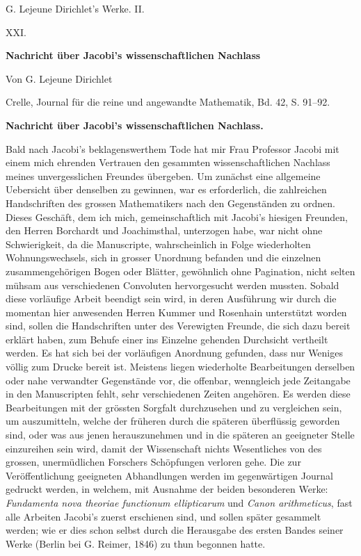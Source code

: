 \documentclass[11pt]{article}
\begin{document}
\begin{center}
{\Large G. Lejeune Dirichlet's Werke. II.}\par\vspace{1.2em}
{\Large XXI.}\par\vspace{0.5em}
{\LARGE \textbf{Nachricht über Jacobi's wissenschaftlichen Nachlass}}\par\vspace{1em}
{\large Von G. Lejeune Dirichlet}\par\vspace{0.5em}
{\small Crelle, Journal für die reine und angewandte Mathematik, Bd. 42, S. 91--92.}
\end{center}

\bigskip
\begin{center}
{\large \textbf{Nachricht über Jacobi's wissenschaftlichen Nachlass.}}
\end{center}

Bald nach Jacobi's beklagenswerthem Tode hat mir Frau Professor Jacobi mit einem mich ehrenden Vertrauen den gesammten wissenschaftlichen Nachlass meines unvergesslichen Freundes übergeben. Um zunächst eine allgemeine Uebersicht über denselben zu gewinnen, war es erforderlich, die zahlreichen Handschriften des grossen Mathematikers nach den Gegenständen zu ordnen. Dieses Geschäft, dem ich mich, gemeinschaftlich mit Jacobi's hiesigen Freunden, den Herren Borchardt und Joachimsthal, unterzogen habe, war nicht ohne Schwierigkeit, da die Manuscripte, wahrscheinlich in Folge wiederholten Wohnungswechsels, sich in grosser Unordnung befanden und die einzelnen zusammengehörigen Bogen oder Blätter, gewöhnlich ohne Pagination, nicht selten mühsam aus verschiedenen Convoluten hervorgesucht werden mussten. Sobald diese vorläufige Arbeit beendigt sein wird, in deren Ausführung wir durch die momentan hier anwesenden Herren Kummer und Rosenhain unterstützt worden sind, sollen die Handschriften unter des Verewigten Freunde, die sich dazu bereit erklärt haben, zum Behufe einer ins Einzelne gehenden Durchsicht vertheilt werden. Es hat sich bei der vorläufigen Anordnung gefunden, dass nur Weniges völlig zum Drucke bereit ist. Meistens liegen wiederholte Bearbeitungen derselben oder nahe verwandter Gegenstände vor, die offenbar, wenngleich jede Zeitangabe in den Manuscripten fehlt, sehr verschiedenen Zeiten angehören. Es werden diese Bearbeitungen mit der grössten Sorgfalt durchzusehen und zu vergleichen sein, um auszumitteln, welche der früheren durch die späteren überflüssig geworden sind, oder was aus jenen herauszunehmen und in die späteren an geeigneter Stelle einzureihen sein wird, damit der Wissenschaft nichts Wesentliches von des grossen, unermüdlichen Forschers Schöpfungen verloren gehe. Die zur Veröffentlichung geeigneten Abhandlungen werden im gegenwärtigen Journal gedruckt werden, in welchem, mit Ausnahme der beiden besonderen Werke: \emph{Fundamenta nova theoriae functionum ellipticarum} und \emph{Canon arithmeticus}, fast alle Arbeiten Jacobi's zuerst erschienen sind, und sollen später gesammelt werden; wie er dies schon selbst durch die Herausgabe des ersten Bandes seiner Werke (Berlin bei G. Reimer, 1846) zu thun begonnen hatte.
\end{document}
